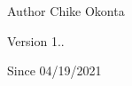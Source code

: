 \begin{DoxyAuthor}{Author}
Chike Okonta 
\end{DoxyAuthor}
\begin{DoxyVersion}{Version}
1.. 
\end{DoxyVersion}
\begin{DoxySince}{Since}
04/19/2021 
\end{DoxySince}
